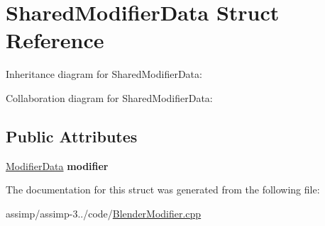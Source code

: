 \hypertarget{struct_shared_modifier_data}{\section{Shared\+Modifier\+Data Struct Reference}
\label{struct_shared_modifier_data}
}


Inheritance diagram for Shared\+Modifier\+Data\+:


Collaboration diagram for Shared\+Modifier\+Data\+:
\subsection*{Public Attributes}
\begin{DoxyCompactItemize}
\item 
\hypertarget{struct_shared_modifier_data_a8094493cf7f618d0f7391f4d1fe678c5}{\hyperlink{struct_assimp_1_1_blender_1_1_modifier_data}{Modifier\+Data} {\bfseries modifier}}\label{struct_shared_modifier_data_a8094493cf7f618d0f7391f4d1fe678c5}

\end{DoxyCompactItemize}


The documentation for this struct was generated from the following file\+:\begin{DoxyCompactItemize}
\item 
assimp/assimp-\/3../code/\hyperlink{_blender_modifier_8cpp}{Blender\+Modifier.\+cpp}\end{DoxyCompactItemize}
